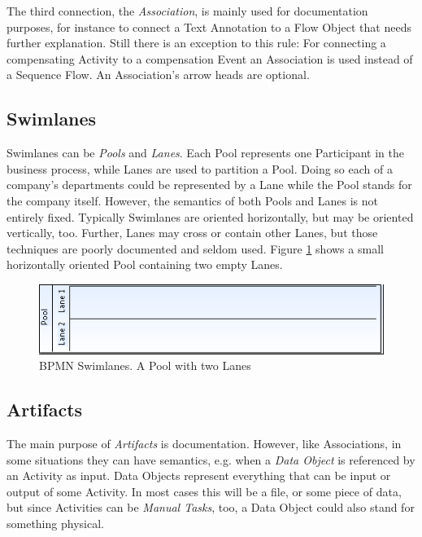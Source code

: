 The third connection, the \emph{Association}, is mainly used for documentation
purposes, for instance to connect a Text Annotation to a Flow Object that needs
further explanation.  Still there is an exception to this rule: For connecting a
compensating Activity to a compensation Event an Association is used instead of
a Sequence Flow.  An Association's arrow heads are optional.


\subsection{Swimlanes}

Swimlanes can be \emph{Pools} and \emph{Lanes}.  Each Pool represents one
Participant in the business process, while Lanes are used to partition a Pool.
Doing so each of a company's departments could be represented by a Lane while the
Pool stands for the company itself.  However, the semantics of both Pools and
Lanes is not entirely fixed.  Typically Swimlanes are oriented horizontally,
but may be oriented vertically, too.  Further, Lanes may cross or contain other
Lanes, but those techniques are poorly documented and seldom used.  Figure
\ref{fig:swimlanes} shows a small horizontally oriented Pool containing two empty
Lanes.

\begin{figure}[ht]
	\centering
	\includegraphics[width=.75\textwidth]{figures/bpmn/swimlanes.png}
	\caption[BPMN Swimlanes]{BPMN Swimlanes. A Pool with two Lanes}
	\label{fig:swimlanes}
\end{figure}


\subsection{Artifacts}

The main purpose of \emph{Artifacts} is documentation.  However, like Associations,
in some situations they can have semantics, e.g. when a \emph{Data Object} is
referenced by an Activity as input.  Data Objects represent everything that can
be input or output of some Activity.  In most cases this will be a file, or some
piece of data, but since Activities can be \emph{Manual Tasks}, too, a Data Object
could also stand for something physical.

